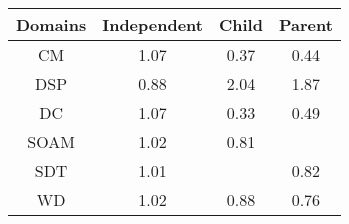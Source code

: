 \begin{tabular}{|c||c|c|c|}
\hline
Domains & Independent & Child & Parent \\ 
\hline
CM & \cellcolor[rgb]{0.8831937890044634,0.8273023211073773,0.42} 1.07 & \cellcolor[rgb]{0.767847837109071,0.1671464289829362,0.2873246479684663} 0.37 & \cellcolor[rgb]{0.7847317028970627,0.24706339371276353,0.30308292270392523} 0.44 \\ 
\hline
DSP & \cellcolor[rgb]{0.8833690814606936,0.7139469855806159,0.3951444760299806} 0.88 & \cellcolor[rgb]{0.53,0.66,0.42} 2.04 & \cellcolor[rgb]{0.5926905933714898,0.6896955442286005,0.42} 1.87 \\ 
\hline
DC & \cellcolor[rgb]{0.8825664104439797,0.8270051417892534,0.42} 1.07 & \cellcolor[rgb]{0.76,0.13,0.28} 0.33 & \cellcolor[rgb]{0.7946059751212081,0.2938016155737182,0.31229891011312755} 0.49 \\ 
\hline
SOAM & \cellcolor[rgb]{0.9042972657672543,0.8372987048371204,0.42} 1.02 & \cellcolor[rgb]{0.866338088791617,0.6333336202803208,0.3792488828721759} 0.81 &  \\ 
\hline
SDT & \cellcolor[rgb]{0.9073122545559295,0.8387268574212297,0.42} 1.01 &  & \cellcolor[rgb]{0.8690241335665662,0.646047565548413,0.38175585799546174} 0.82 \\ 
\hline
WD & \cellcolor[rgb]{0.9034275194410498,0.8368867197352341,0.42} 1.02 & \cellcolor[rgb]{0.8833307998490849,0.7137657859523353,0.39510874652581257} 0.88 & \cellcolor[rgb]{0.8561025841473582,0.5848855649641621,0.36969574520420095} 0.76 \\ 
\hline
\end{tabular}